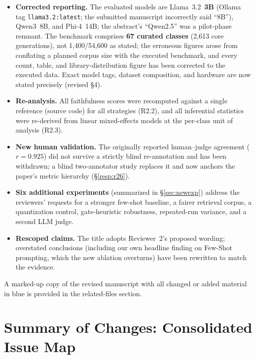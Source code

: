 \documentclass[11pt]{article}
\begin{document}
\begin{itemize}[leftmargin=1.4em]
  \item \textbf{Corrected reporting.} The evaluated models are Llama~3.2~\textbf{3B} (Ollama tag \texttt{llama3.2:latest}; the submitted manuscript incorrectly said ``8B''), Qwen3~8B, and Phi-4~14B; the abstract's ``Qwen2.5'' was a pilot-phase remnant. The benchmark comprises \textbf{67 curated classes} (2{,}613 core generations), not 1{,}400/54{,}600 as stated; the erroneous figures arose from conflating a planned corpus size with the executed benchmark, and every count, table, and library-distribution figure has been corrected to the executed data. Exact model tags, dataset composition, and hardware are now stated precisely (revised \S4).
  \item \textbf{Re-analysis.} All faithfulness scores were recomputed against a single reference (source code) for all strategies (R2.2), and all inferential statistics were re-derived from linear mixed-effects models at the per-class unit of analysis (R2.3).
  \item \textbf{New human validation.} The originally reported human--judge agreement ($r{=}0.925$) did not survive a strictly blind re-annotation and has been withdrawn; a blind two-annotator study replaces it and now anchors the paper's metric hierarchy (\S\ref{resp:r26}).
  \item \textbf{Six additional experiments} (summarized in \S\ref{sec:newexp}) address the reviewers' requests for a stronger few-shot baseline, a fairer retrieval corpus, a quantization control, gate-heuristic robustness, repeated-run variance, and a second LLM judge.
  \item \textbf{Rescoped claims.} The title adopts Reviewer~2's proposed wording; overstated conclusions (including our own headline finding on Few-Shot prompting, which the new ablation overturns) have been rewritten to match the evidence.
\end{itemize}

A marked-up copy of the revised manuscript with all changed or added material in blue is provided in the related-files section.

\section*{Summary of Changes: Consolidated Issue Map}
\end{document}
